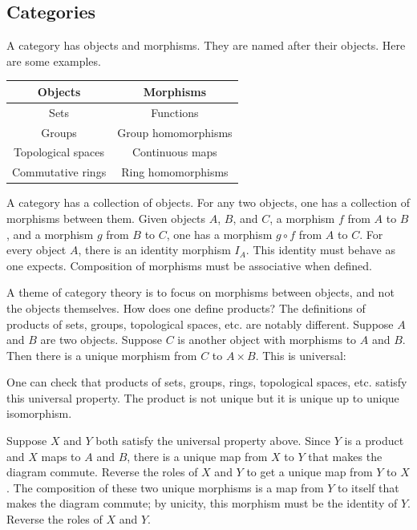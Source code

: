 \documentclass [11 pt, oneside, margin = 1 in] {article}
\begin{document}
\subsection{Categories}
A category has objects and morphisms. They are named after their objects. Here are some examples.
	\begin{center}
\begin{tabular}{cc}
    Objects & Morphisms\\
    \midrule
    Sets & Functions\\
    Groups & Group homomorphisms\\
    Topological spaces & Continuous maps\\
    Commutative rings & Ring homomorphisms
\end{tabular}
\end{center}
A category has a collection of objects. For any two objects, one has a collection of morphisms between them. Given objects $A$, $B$, and $C$, a morphism $f$ from $A$ to $B$, and a morphism $g$ from $B$ to $C$, one has a morphism $g\circ f$ from $A$ to $C$. For every object $A$, there is an identity morphism $I_A$. This identity must behave as one expects. Composition of morphisms must be associative when defined.

A theme of category theory is to focus on morphisms between objects, and not the objects themselves. How does one define products? The definitions of products of sets, groups, topological spaces, etc. are notably different. Suppose $A$ and $B$ are two objects. Suppose $C$ is another object with morphisms to $A$ and $B$. Then there is a unique morphism from $C$ to $A\times B$. This is universal:
\begin{center}
\end{center}
One can check that products of sets, groups, rings, topological spaces, etc. satisfy this universal property. The product is not unique but it is unique up to unique isomorphism.

Suppose $X$ and $Y$ both satisfy the universal property above. Since $Y$ is a product and $X$ maps to $A$ and $B$, there is a unique map from $X$ to $Y$ that makes the diagram commute. Reverse the roles of $X$ and $Y$ to get a unique map from $Y$ to $X$. The composition of these two unique morphisms is a map from $Y$ to itself that makes the diagram commute; by unicity, this morphism must be the identity of $Y$. Reverse the roles of $X$ and $Y$.
\end{document}
